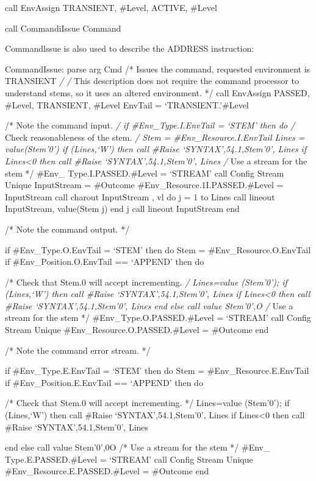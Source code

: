 call EnvAssign TRANSIENT, \#Level, ACTIVE, \#Level

call CommandiIssue Command

Commandlssue is also used to describe the ADDRESS instruction:

CommandIssue: parse arg Cmd /* Issues the command, requested environment
is TRANSIENT \emph{/ /} This description does not require the command
processor to understand stems, so it uses an altered environment. */
call EnvAssign PASSED, \#Level, TRANSIENT, \#Level EnvTail =
`TRANSIENT.'\#Level

/* Note the command input. \emph{/ if \#Env\_Type.I.EnvTail = `STEM'
then do /} Check reasonableness of the stem. \emph{/ Stem =
\#Env\_Resource.I.EnvTail Lines = value(Stem'0') if \datatype(Lines,`W')
then call \#Raise `SYNTAX',54.1,Stem'0', Lines if Lines\textless0 then
call \#Raise `SYNTAX',54.1,Stem'0', Lines /} Use a stream for the stem
*/ \#Env\_ Type.I.PASSED.\#Level = `STREAM' call Config Stream Unique
InputStream = \#Outcome \#Env\_Resource.1I.PASSED.\#Level = InputStream
call charout InputStream , vl do j = 1 to Lines call lineout
InputStream, value(Stem \textbar\textbar{} j) end j call lineout
InputStream end

/* Note the command output. */

if \#Env\_Type.O.EnvTail = `STEM' then do Stem =
\#Env\_Resource.O.EnvTail if \#Env\_Position.O.EnvTail == `APPEND' then
do

/* Check that Stem.0 will accept incrementing. \emph{/ Lines=value
(Stem'0'); if \datatype(Lines,`W') then call \#Raise
`SYNTAX',54.1,Stem'0', Lines if Lines\textless0 then call \#Raise
`SYNTAX',54.1,Stem'0', Lines end else call value Stem'0',O /} Use a
stream for the stem */ \#Env\_Type.O.PASSED.\#Level = `STREAM' call
Config Stream Unique \#Env\_Resource.O.PASSED.\#Level = \#Outcome end

/* Note the command error stream. */

if \#Env\_Type.E.EnvTail = `STEM' then do Stem =
\#Env\_Resource.E.EnvTail if \#Env\_Position.E.EnvTail == `APPEND' then
do

/* Check that Stem.0 will accept incrementing. */ Lines=value (Stem'0');
if \datatype(Lines,`W') then call \#Raise `SYNTAX',54.1,Stem'0', Lines
if Lines\textless0 then call \#Raise `SYNTAX',54.1,Stem'0', Lines

end else call value Stem'0',0O /* Use a stream for the stem */ \#Env\_
Type.E.PASSED.\#Level = `STREAM' call Config Stream Unique
\#Env\_Resource.E.PASSED.\#Level = \#Outcome end

